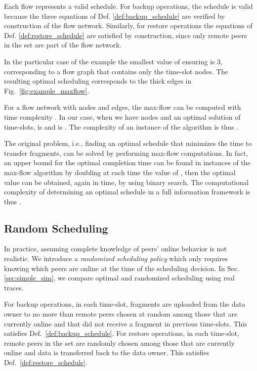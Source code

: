 \documentclass[conference,10pt]{IEEEtran}
\begin{document}
Each  flow represents a valid schedule. For backup operations,
the schedule is valid because the three equations of
Def. \ref{def:backup_schedule} are verified by construction of the
flow network. Similarly, for restore operations the equations of
Def. \ref{def:restore_schedule} are satisfied by construction, since
only remote peers in the set  are part of the flow network.

In the particular case of the example the smallest value of 
ensuring  is 3, corresponding to a flow graph that
contains only the  time-slot nodes. The resulting
optimal scheduling corresponds to the thick edges in
Fig.~\ref{fig:example_maxflow}.

For a flow network with  nodes and  edges, the max-flow can be computed with time complexity  \cite{12144}. In our case, when we have  nodes and an optimal solution of  time-slots,  is  and  is . The complexity of an instance of the algorithm is thus .

The original problem, i.e., finding an optimal schedule that minimizes
the time to transfer  fragments, can be solved by performing
 max-flow computations. In fact, an upper bound for the
optimal completion time can be found in  instances of the
max-flow algorithm by doubling at each time the value of , then the
optimal value can be obtained, again in  time, by using
binary search. The computational complexity of determining an optimal
schedule in a full information framework is thus .

\subsection{Random Scheduling}

In practice, assuming complete knowledge of peers' online behavior is
not realistic. We introduce a \emph{randomized scheduling policy}
which only requires knowing which peers are online at the time of the
scheduling decision. In Sec. \ref{sec:simple_sim}, we compare
optimal and randomized scheduling using real traces.

For backup operations, in each time-slot, fragments are uploaded from
the data owner to no more than  remote peers chosen at random
among those that are currently online and that did not receive a
fragment in previous time-slots. This satisfies
Def.~\ref{def:backup_schedule}. For restore operations, in each
time-slot,  remote peers in the set  are randomly chosen among
those that are currently online and data is transferred back to the
data owner. This satisfies Def.~\ref{def:restore_schedule}.
\end{document}

